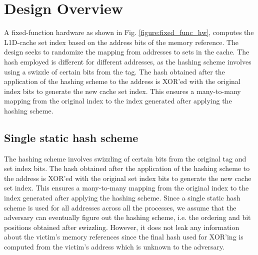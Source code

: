 \section{Design Overview}
A fixed-function hardware as shown in Fig. \ref{figure:fixed_func_hw}, computes the L1D-cache set index based on the address bits of the memory reference. The design seeks to randomize the mapping from addresses to sets in the cache.  The hash employed is different for different addresses, as the hashing scheme involves using a swizzle of certain bits from the tag. The hash obtained after the application of the hashing scheme to the address is XOR'ed with the original index bits to generate the new cache set index. This ensures a many-to-many mapping from the original index to the index generated after applying the hashing scheme. 

\subsection{Single static hash scheme}
The hashing scheme involves swizzling of certain bits from the original tag and set index bits. The hash obtained after the application of the hashing scheme to the address is XOR'ed with the original set index bits to generate the new cache set index. This ensures a many-to-many mapping from the original index to the index generated after applying the hashing scheme. Since a single static hash scheme is used for all addresses across all the processes, we assume that the adversary can eventually figure out the hashing scheme, i.e. the ordering and bit positions obtained after swizzling. However, it does not leak any information about the victim's memory references since the final hash used for XOR'ing is computed from the victim's address which is unknown to the adversary.

